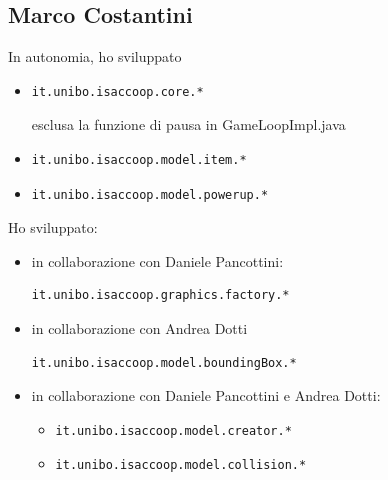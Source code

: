 \documentclass[a4paper,12pt]{report}
\begin{document}
\subsection*{Marco Costantini}
In autonomia, ho sviluppato
\begin{itemize}
    \item \begin{verbatim}it.unibo.isaccoop.core.* \end{verbatim} esclusa la funzione di pausa in GameLoopImpl.java
    \item \begin{verbatim}it.unibo.isaccoop.model.item.* \end{verbatim}
    \item \begin{verbatim}it.unibo.isaccoop.model.powerup.* \end{verbatim}
\end{itemize}
Ho sviluppato:
\begin{itemize}
    \item in collaborazione con Daniele Pancottini: \begin{verbatim}it.unibo.isaccoop.graphics.factory.* \end{verbatim}
    \item in collaborazione con Andrea Dotti \begin{verbatim}it.unibo.isaccoop.model.boundingBox.* \end{verbatim}
    \item in collaborazione con Daniele Pancottini e Andrea Dotti:
    \begin{itemize}
        \item \begin{verbatim}it.unibo.isaccoop.model.creator.* \end{verbatim}
        \item \begin{verbatim}it.unibo.isaccoop.model.collision.* \end{verbatim}
    \end{itemize}
\end{itemize}
\end{document}
